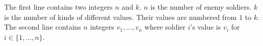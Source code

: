 The first line contains two integers $n$ and $k$.
$n$ is the number of enemy soldiers.
$k$ is the number of kinds of different values.
Their values are numbered from $1$ to $k$.
The second line contains $n$ integers $v_1,\ldots,v_n$
where soldier $i$'s value is $v_i$ for $i\in\{1,\ldots,n\}$.
